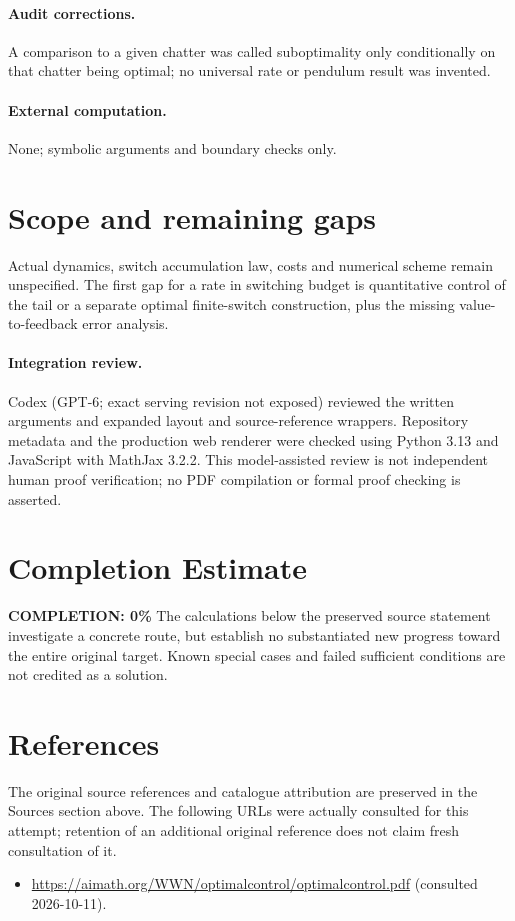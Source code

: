 \documentclass[11pt]{article}
\begin{document}
\paragraph{Audit corrections.} A comparison to a given chatter was called suboptimality only conditionally on that chatter being optimal; no universal rate or pendulum result was invented.
\paragraph{External computation.} None; symbolic arguments and boundary checks only.
\section{Scope and remaining gaps}
Actual dynamics, switch accumulation law, costs and numerical scheme remain
unspecified. The first gap for a rate in switching budget is quantitative
control of the tail or a separate optimal finite-switch construction, plus
the missing value-to-feedback error analysis.
\paragraph{Integration review.} Codex (GPT-6; exact serving revision not exposed) reviewed the written arguments and expanded layout and source-reference wrappers. Repository metadata and the production web renderer were checked using Python 3.13 and JavaScript with MathJax 3.2.2. This model-assisted review is not independent human proof verification; no PDF compilation or formal proof checking is asserted.

\section{Completion Estimate}
\noindent\textbf{COMPLETION: 0\%}
The calculations below the preserved source statement investigate a concrete route,
but establish no substantiated new progress toward the entire original target.
Known special cases and failed sufficient conditions are not credited as a solution.
\section{References}
The original source references and catalogue attribution are preserved in the
Sources section above. The following URLs were actually consulted for this attempt;
retention of an additional original reference does not claim fresh consultation of it.
\begin{itemize}
\item \url{https://aimath.org/WWN/optimalcontrol/optimalcontrol.pdf} (consulted 2026-10-11). 
\end{itemize}
\end{document}
